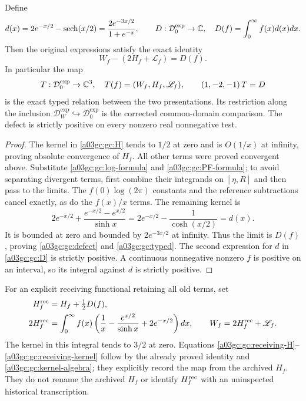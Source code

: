 \begin{theorem}
Define
\begin{equation}
 d(x)=2e^{-x/2}-\operatorname{sech}(x/2)
     =\frac{2e^{-3x/2}}{1+e^{-x}},\qquad
 D:\mathcal D_0^{\exp}\to\mathbb C,\quad D(f)=\int_0^\infty f(x)d(x)dx.
 \label{a03gc:gc:D}
\end{equation}
Then the original expressions satisfy the exact identity
\begin{equation}
 \boxed{W_f-(2H_f+\mathscr L_f)=D(f).}
 \label{a03gc:gc:defect}
\end{equation}
In particular the map
\begin{equation}
 T:\mathcal D_0^{\exp}\to\mathbb C^3,\quad T(f)=(W_f,H_f,\mathscr L_f),
 \qquad (1,-2,-1)\,T=D
 \label{a03gc:gc:typed}
\end{equation}
is the exact typed relation between the two presentations.  Its restriction
along the inclusion $\mathcal D_W^{\exp}\hookrightarrow\mathcal D_0^{\exp}$
is the corrected common-domain comparison.
The defect is strictly positive on every nonzero real nonnegative test.
\end{theorem}
\begin{proof}
The kernel in \eqref{a03gc:gc:H} tends to $1/2$ at zero and is $O(1/x)$ at
infinity, proving absolute convergence of $H_f$.  All other terms were
proved convergent above.  Substitute \eqref{a03gc:gc:log-formula} and
\eqref{a03gc:gc:PF-formula}; to avoid separating divergent terms, first combine
their integrands on $[\eta,R]$ and then pass to the limits.  The
$f(0)\log(2\pi)$ constants and the reference subtractions cancel exactly,
as do the $f(x)/x$ terms.  The remaining kernel is
\begin{equation}
 2e^{-x/2}+\frac{e^{-x/2}-e^{x/2}}{\sinh x}
 =2e^{-x/2}-\frac1{\cosh(x/2)}=d(x).
 \label{a03gc:gc:kernel-algebra}
\end{equation}
It is bounded at zero and bounded by $2e^{-3x/2}$ at infinity.
Thus the limit is $D(f)$, proving \eqref{a03gc:gc:defect} and \eqref{a03gc:gc:typed}.
The second expression for $d$ in \eqref{a03gc:gc:D} is strictly positive.
A continuous nonnegative nonzero $f$ is positive on an interval, so its
integral against $d$ is strictly positive.
\end{proof}

For an explicit receiving functional retaining all old terms, set
\begin{align}
 H_f^{\rm rec}&=H_f+\tfrac12D(f),\label{a03gc:gc:receiving-H}\\
 2H_f^{\rm rec}
 &=\int_0^\infty f(x)
  \left(\frac1x-\frac{e^{x/2}}{\sinh x}+2e^{-x/2}\right)dx,
 \qquad W_f=2H_f^{\rm rec}+\mathscr L_f.
 \label{a03gc:gc:receiving-kernel}
\end{align}
The kernel in this integral tends to $3/2$ at zero.  Equations
\eqref{a03gc:gc:receiving-H}--\eqref{a03gc:gc:receiving-kernel} follow by the already
proved identity and \eqref{a03gc:gc:kernel-algebra}; they explicitly record the
map from the archived $H_f$.  They do not rename the archived $H_f$ or
identify $H_f^{\rm rec}$ with an uninspected historical transcription.

